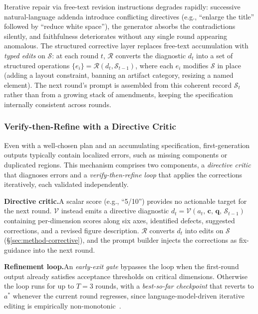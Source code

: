 \documentclass{article}
\begin{document}
Iterative repair via free-text revision instructions degrades rapidly: successive natural-language addenda introduce conflicting directives (e.g., ``enlarge the title'' followed by ``reduce white space''), the generator absorbs the contradictions silently, and faithfulness deteriorates without any single round appearing anomalous. The structured corrective layer replaces free-text accumulation with \emph{typed edits} on $\mathcal{S}$: at each round $t$, $\mathcal{R}$ converts the diagnostic $d_t$ into a set of structured operations $\{e_i\} = \mathcal{R}(d_t, \mathcal{S}_{t-1})$, where each $e_i$ modifies $\mathcal{S}$ in place (adding a layout constraint, banning an artifact category, resizing a named element). The next round's prompt is assembled from this coherent record $\mathcal{S}_t$ rather than from a growing stack of amendments, keeping the specification internally consistent across rounds. 

\subsubsection{Verify-then-Refine with a Directive Critic}
\label{sec:method-verify}

Even with a well-chosen plan and an accumulating specification, first-generation outputs typically contain localized errors, such as missing components or duplicated regions. This mechanism comprises two components, a \emph{directive critic} that diagnoses errors and a \emph{verify-then-refine loop} that applies the corrections iteratively, each validated independently.

\textbf{Directive critic.}\quad A scalar score (e.g., ``5/10'') provides no actionable target for the next round. $\mathcal{V}$ instead emits a directive diagnostic $d_t = \mathcal{V}(a_t,\,\mathbf{c},\,\mathbf{q},\,\mathcal{S}_{t-1})$ containing per-dimension scores along six axes, identified defects, suggested corrections, and a revised figure description. $\mathcal{R}$ converts $d_t$ into edits on $\mathcal{S}$ (\S\ref{sec:method-corrective}), and the prompt builder injects the corrections as fix-guidance into the next round.

\textbf{Refinement loop.}\quad An \emph{early-exit gate} bypasses the loop when the first-round output already satisfies acceptance thresholds on critical dimensions. Otherwise the loop runs for up to $T{=}3$ rounds, with a \emph{best-so-far checkpoint} that reverts to $a^*$ whenever the current round regresses, since language-model-driven iterative editing is empirically non-monotonic~\citep{madaan2023selfrefine}.
\end{document}

